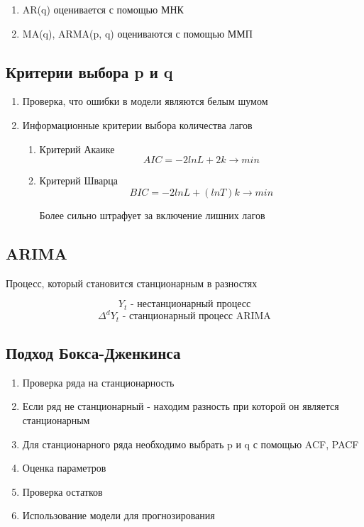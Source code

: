 \documentclass[a4paper, 12pt]{article}
\begin{document}
\begin{enumerate}
    \item AR(q) оценивается с помощью МНК
    \item MA(q), ARMA(p, q) оцениваются с помощью ММП
\end{enumerate}

\subsection{Критерии выбора p и q}

\begin{enumerate}
    \item Проверка, что ошибки в модели являются белым шумом
    \item Информационные критерии выбора количества лагов
    \begin{enumerate}
        \item Критерий Акаике
        \[AIC = -2lnL + 2k \rightarrow min\]
        \item Критерий Шварца
        \[BIC = -2lnL + (lnT)k \rightarrow min\] 
        
         Более сильно штрафует за включение лишних лагов
    \end{enumerate}
\end{enumerate}

\subsection{ARIMA}

Процесс, который становится станционарным в разностях

\[Y_{t} \textrm{ - нестанционарный процесс}\]
\[\Delta^{d}Y_{t} \textrm{ - станционарный процесс ARIMA}\]

\subsection{Подход Бокса-Дженкинса}

\begin{enumerate}
    \item Проверка ряда на станционарность
    \item Если ряд не станционарный - находим разность при которой он является станционарным
    \item Для станционарного ряда необходимо выбрать p и q с помощью ACF, PACF
    \item Оценка параметров
    \item Проверка остатков
    \item Использование модели для прогнозирования
\end{enumerate}
\end{document}
